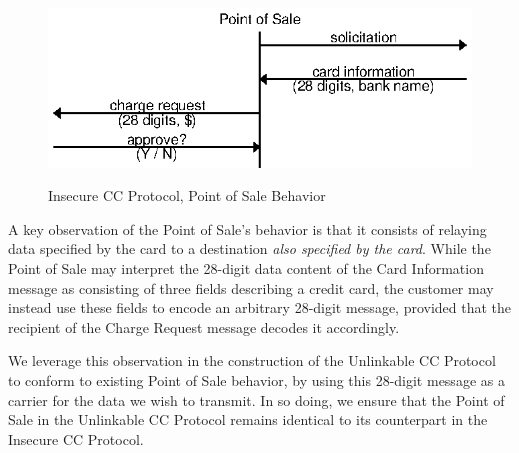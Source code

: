 \begin{figure}[h!]
  \caption{Insecure CC Protocol, Point of Sale Behavior}
  \centering
    \includegraphics{img/interface_pos.eps}
  \label{fig:interface_pos}
\end{figure}

A key observation of the Point of Sale's behavior is that it consists of relaying data
	specified by the card to a destination \emph{also specified by the card}.
While the Point of Sale may interpret the 28-digit data content of the Card Information message as consisting of three fields describing a credit card,
	the customer may instead use these fields to encode an arbitrary 28-digit message, provided that the recipient of the Charge Request message decodes it accordingly.

We leverage this observation in the construction of the Unlinkable CC Protocol to conform to existing Point of Sale behavior,
	by using this 28-digit message as a carrier for the data we wish to transmit.
In so doing, we ensure that the Point of Sale in the Unlinkable CC Protocol remains identical to its counterpart in the Insecure CC Protocol.
